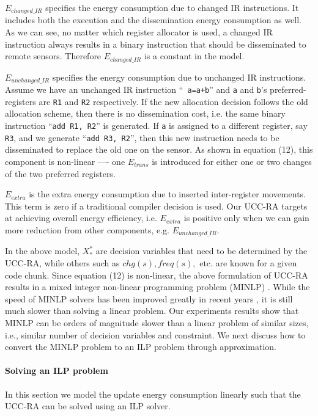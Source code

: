 $E_{changed\_IR}$ specifies the energy consumption due to changed IR
instructions. It includes both the execution and the dissemination
energy consumption as well. As we can see, no matter which register
allocator is used, a changed IR instruction always results in a binary
instruction that should be disseminated to remote sensors. Therefore
$E_{changed\_IR}$ is a constant in the model.

$E_{unchanged\_IR}$ specifies the energy consumption due to unchanged
IR instructions. Assume we have an unchanged IR instruction ``{\tt
a=a+b}'' and {\tt a} and {\tt b}'s preferred-registers are {\tt R1}
and {\tt R2} respectively. If the new allocation decision follows the
old allocation scheme, then there is no dissemination cost, i.e. the
same binary instruction ``{\tt add R1, R2}'' is generated. If {\tt a}
is assigned to a different register, say {\tt R3}, and we generate
``{\tt add R3, R2}'', then this new instruction needs to be
disseminated to replace the old one on the sensor. As shown in
equation (12), this component is non-linear ---- one $E_{trans}$ is
introduced for either one or two changes of the two preferred
registers.

$E_{extra}$ is the extra energy consumption due to inserted
inter-register movements. This term is zero if a traditional compiler
decision is used. Our UCC-RA targets at achieving overall energy efficiency,
i.e. $E_{extra}$ is positive only when we can gain more reduction from
other components, e.g. $E_{unchanged\_IR}$.

In the above model, $X_{*}^{*}$ are decision variables that need to be
determined by the UCC-RA, while others such as $chg(s), freq(s),$
etc.  are known for a given code chunk.  Since equation (12) is
non-linear, the above formulation of UCC-RA results in a mixed integer
non-linear programming problem (MINLP) \cite{bonmin}.  While the speed
of MINLP solvers has been improved greatly in recent years
\cite{bonmin}, it is still much slower than solving a linear problem.  Our
experiments results show that MINLP can be orders of magnitude slower
than a linear problem of similar sizes, i.e., similar number of
decision variables and constraint. We next discuss how to convert the
MINLP problem to an ILP problem through approximation.

\paragraph{Solving an ILP problem}
In this section we model the update energy consumption
linearly such that the UCC-RA can be solved using an ILP
solver. 




